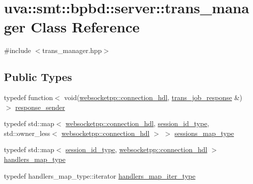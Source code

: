 \hypertarget{classuva_1_1smt_1_1bpbd_1_1server_1_1trans__manager}{}\section{uva\+:\+:smt\+:\+:bpbd\+:\+:server\+:\+:trans\+\_\+manager Class Reference}
\label{classuva_1_1smt_1_1bpbd_1_1server_1_1trans__manager}


{\ttfamily \#include $<$trans\+\_\+manager.\+hpp$>$}

\subsection*{Public Types}
\begin{DoxyCompactItemize}
\item 
typedef function$<$ void(\hyperlink{namespacewebsocketpp_a6b3d26a10ee7229b84b776786332631d}{websocketpp\+::connection\+\_\+hdl}, \hyperlink{classuva_1_1smt_1_1bpbd_1_1common_1_1messaging_1_1trans__job__response}{trans\+\_\+job\+\_\+response} \&) $>$ \hyperlink{classuva_1_1smt_1_1bpbd_1_1server_1_1trans__manager_ac7a3a0d2d4e7d21b2ce55161bf84f53e}{response\+\_\+sender}
\item 
typedef std\+::map$<$ \hyperlink{namespacewebsocketpp_a6b3d26a10ee7229b84b776786332631d}{websocketpp\+::connection\+\_\+hdl}, \hyperlink{namespaceuva_1_1smt_1_1bpbd_1_1common_1_1messaging_a17ad17f94b78abb87ab5f3f3d6f09588}{session\+\_\+id\+\_\+type}, std\+::owner\+\_\+less$<$ \hyperlink{namespacewebsocketpp_a6b3d26a10ee7229b84b776786332631d}{websocketpp\+::connection\+\_\+hdl} $>$ $>$ \hyperlink{classuva_1_1smt_1_1bpbd_1_1server_1_1trans__manager_aea69500c7a8a6bcb5b2035a684537bcb}{sessions\+\_\+map\+\_\+type}
\item 
typedef std\+::map$<$ \hyperlink{namespaceuva_1_1smt_1_1bpbd_1_1common_1_1messaging_a17ad17f94b78abb87ab5f3f3d6f09588}{session\+\_\+id\+\_\+type}, \hyperlink{namespacewebsocketpp_a6b3d26a10ee7229b84b776786332631d}{websocketpp\+::connection\+\_\+hdl} $>$ \hyperlink{classuva_1_1smt_1_1bpbd_1_1server_1_1trans__manager_ad5d869b7da9455a2903c5682dde5bcfe}{handlers\+\_\+map\+\_\+type}
\item 
typedef handlers\+\_\+map\+\_\+type\+::iterator \hyperlink{classuva_1_1smt_1_1bpbd_1_1server_1_1trans__manager_adec62cec51f0ade28dbf9311b3a3b4ad}{handlers\+\_\+map\+\_\+iter\+\_\+type}
\end{DoxyCompactItemize}
